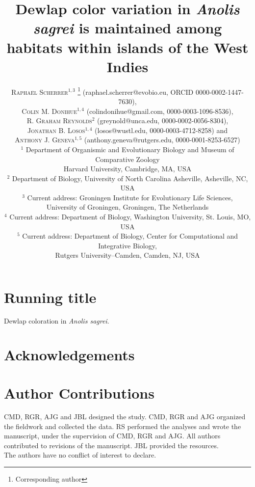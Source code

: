 \documentclass{article}
\title{Dewlap color variation in \textit{Anolis sagrei} is maintained among habitats within islands of the West Indies}
\author{
	
	\textsc{Rapha\"{e}l Scherrer}$^{1,3}$ \thanks{Corresponding author} (raphael.scherrer@evobio.eu, ORCID 0000-0002-1447-7630),\\
    \textsc{Colin M. Donihue}$^{1,4}$ (colindonihue@gmail.com, 0000-0003-1096-8536),\\
	\textsc{R. Graham Reynolds}$^2$ (greynold@unca.edu, 0000-0002-0056-8304),\\ 
    \textsc{Jonathan B. Losos}$^{1,4}$ (losos@wustl.edu, 0000-0003-4712-8258) and\\
	\textsc{Anthony J. Geneva}$^{1,5}$ (anthony.geneva@rutgers.edu, 0000-0001-8253-6527)\\[1ex]
	
	\normalsize $^1$ Department of Organismic and Evolutionary Biology and Museum of Comparative Zoology \\ \normalsize Harvard University, Cambridge, MA, USA \\
	\normalsize $^2$ Department of Biology, University of North Carolina Asheville, Asheville, NC, USA\\ 
	\normalsize $^3$ Current address: Groningen Institute for Evolutionary Life Sciences,\\
	\normalsize University of Groningen, Groningen, The Netherlands\\
	\normalsize $^4$ Current address: Department of Biology, Washington University, St. Louis, MO, USA\\
	\normalsize $^5$ Current address: Department of Biology, Center for Computational and Integrative Biology,\\ \normalsize Rutgers University--Camden, Camden, NJ, USA

}
\date{} %
\begin{document}
	
	\maketitle
	
	\section*{Running title}
	
	Dewlap coloration in \textit{Anolis sagrei}.

	\section*{Acknowledgements}
	
	
	
	\section*{Author Contributions}
	
	CMD, RGR, AJG and JBL designed the study. CMD, RGR and AJG organized the fieldwork and collected the data. RS performed the analyses and wrote the manuscript, under the supervision of CMD, RGR and AJG. All authors contributed to revisions of the manuscript. JBL provided the resources.\\
	
	The authors have no conflict of interest to declare.
	
\end{document}
